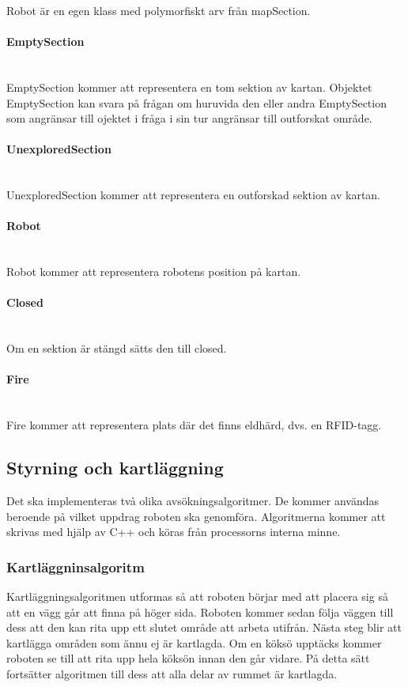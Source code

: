 \documentclass[a4paper,12pt,fleqn]{article}
\begin{document}
Robot är en egen klass med polymorfiskt arv från mapSection.

\paragraph{EmptySection} 
~\\
EmptySection kommer att representera en tom sektion av kartan. Objektet EmptySection kan svara på frågan om huruvida den eller andra EmptySection som angränsar till ojektet i fråga i sin tur angränsar till outforskat område. 

\paragraph{UnexploredSection} 
~\\
UnexploredSection kommer att representera en outforskad sektion av kartan. 

\paragraph{Robot} 
~\\
Robot kommer att representera robotens position på kartan. 

\paragraph{Closed} 
~\\
Om en sektion är stängd sätts den till closed.
\paragraph{Fire} 
~\\
Fire kommer att representera plats där det finns eldhärd, dvs. en RFID-tagg. 
\newpage


\subsection{Styrning och kartläggning}
Det ska implementeras två olika avsökningsalgoritmer. De kommer användas beroende på vilket uppdrag roboten ska genomföra. Algoritmerna kommer att skrivas med hjälp av C++ och köras från processorns interna minne. 

\subsubsection{Kartläggninsalgoritm}

Kartläggningsalgoritmen utformas så att roboten börjar med att placera sig så att en vägg går att finna på höger sida. Roboten kommer sedan följa väggen till dess att den kan rita upp ett slutet område att arbeta utifrån. Nästa steg blir att kartlägga områden som ännu ej är kartlagda. Om en köksö upptäcks kommer roboten se till att rita upp hela köksön innan den går vidare. På detta sätt fortsätter algoritmen till dess att alla delar av rummet är kartlagda. 
\end{document}

